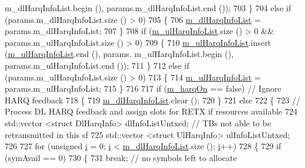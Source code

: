\begin{DoxyCode}
      m\_dlHarqInfoList.begin (), params.m\_dlHarqInfoList.end ());
703         \}
704         \textcolor{keywordflow}{else} \textcolor{keywordflow}{if} (params.m\_dlHarqInfoList.size () > 0)
705         \{
706                 \hyperlink{classns3_1_1MmWaveFlexTtiMacScheduler_af30d399e8abceedfe762a84ea26336b6}{m\_dlHarqInfoList} = params.m\_dlHarqInfoList;
707         \}
708         \textcolor{keywordflow}{if} (\hyperlink{classns3_1_1MmWaveFlexTtiMacScheduler_ae98000612167824fd24cdca1f812bc60}{m\_ulHarqInfoList}.size () > 0 && params.m\_ulHarqInfoList.size () > 0)
709         \{
710                 \hyperlink{classns3_1_1MmWaveFlexTtiMacScheduler_ae98000612167824fd24cdca1f812bc60}{m\_ulHarqInfoList}.insert (\hyperlink{classns3_1_1MmWaveFlexTtiMacScheduler_ae98000612167824fd24cdca1f812bc60}{m\_ulHarqInfoList}.end (), params.
      m\_ulHarqInfoList.begin (), params.m\_ulHarqInfoList.end ());
711         \}
712         \textcolor{keywordflow}{else} \textcolor{keywordflow}{if} (params.m\_ulHarqInfoList.size () > 0)
713         \{
714                 \hyperlink{classns3_1_1MmWaveFlexTtiMacScheduler_ae98000612167824fd24cdca1f812bc60}{m\_ulHarqInfoList} = params.m\_ulHarqInfoList;
715         \}
716 
717         \textcolor{keywordflow}{if} (\hyperlink{classns3_1_1MmWaveFlexTtiMacScheduler_a832729b006315bb770e9f50c16305118}{m\_harqOn} == \textcolor{keyword}{false})          \textcolor{comment}{// Ignore HARQ feedback}
718         \{
719                 \hyperlink{classns3_1_1MmWaveFlexTtiMacScheduler_af30d399e8abceedfe762a84ea26336b6}{m\_dlHarqInfoList}.clear ();
720         \}
721         \textcolor{keywordflow}{else}
722         \{
723                 \textcolor{comment}{// Process DL HARQ feedback and assign slots for RETX if resources available}
724                 std::vector <struct DlHarqInfo> dlInfoListUntxed;  \textcolor{comment}{// TBs not able to be retransmitted in
       this sf}
725                 std::vector <struct UlHarqInfo> ulInfoListUntxed;
726 
727                 \textcolor{keywordflow}{for} (\textcolor{keywordtype}{unsigned} \hyperlink{bernuolliDistribution_8m_a6f6ccfcf58b31cb6412107d9d5281426}{i} = 0; \hyperlink{bernuolliDistribution_8m_a6f6ccfcf58b31cb6412107d9d5281426}{i} < \hyperlink{classns3_1_1MmWaveFlexTtiMacScheduler_af30d399e8abceedfe762a84ea26336b6}{m\_dlHarqInfoList}.size (); 
      \hyperlink{bernuolliDistribution_8m_a6f6ccfcf58b31cb6412107d9d5281426}{i}++)
728                 \{
729                         \textcolor{keywordflow}{if} (symAvail == 0)
730                         \{
731                                 \textcolor{keywordflow}{break};  \textcolor{comment}{// no symbols left to allocate}

\end{DoxyCode}
